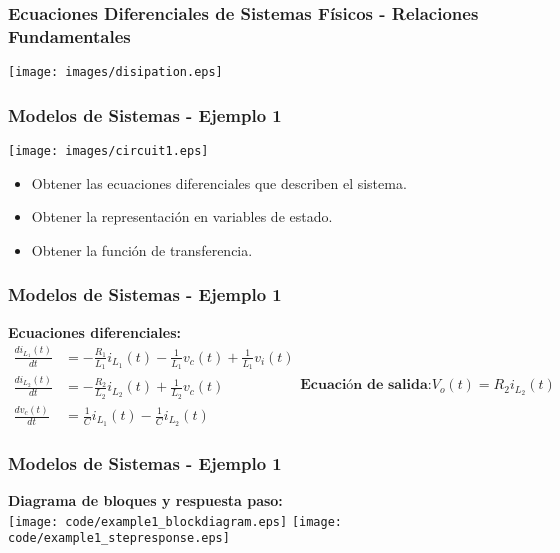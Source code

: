 \documentclass[aspectratio=169,handout]{beamer}
\theoremstyle{definition}
\theoremstyle{plain}
\theoremstyle{remark}
\begin{document}
\begin{frame}[<+->]\frametitle{Ecuaciones Diferenciales de Sistemas Físicos - Relaciones Fundamentales}
\centering
\texttt{[image: images/disipation.eps]}
\end{frame}

\begin{frame}[<+->]\frametitle{Modelos de Sistemas - Ejemplo 1}
\centering
\texttt{[image: images/circuit1.eps]}
\begin{itemize}
  \item Obtener las ecuaciones diferenciales que describen el sistema.
  \item Obtener la representación en variables de estado.
  \item Obtener la función de transferencia.
\end{itemize}
\end{frame}

\begin{frame}[<+->]\frametitle{Modelos de Sistemas - Ejemplo 1}
\textbf{Ecuaciones diferenciales:}
\begin{subequations}\label{eq:diff_eqs}
\begin{align}
  \frac{di_{L_1}(t)}{dt} &= -\frac{R_1}{L_1}i_{L_1}(t) - \frac{1}{L_1} v_c(t) + \frac{1}{L_1} v_i(t) \\
  \frac{di_{L_2}(t)}{dt} &= -\frac{R_2}{L_2}i_{L_2}(t) + \frac{1}{L_2} v_c(t) \\
  \frac{dv_c(t)}{dt} &= \frac{1}{C}i_{L_1}(t) - \frac{1}{C}i_{L_2}(t)
\end{align}
\textbf{Ecuación de salida:}
\begin{equation}
  V_o(t) = R_2 i_{L_2}(t)
\end{equation}
\end{subequations}
\end{frame}

\begin{frame}[<+->]\frametitle{Modelos de Sistemas - Ejemplo 1}
\textbf{Diagrama de bloques y respuesta paso:}\\
\vspace*{3mm}
\centering
\texttt{[image: code/example1\_blockdiagram.eps]}
\pause
\hspace*{5mm}
\texttt{[image: code/example1\_stepresponse.eps]}
\end{frame}
\end{document}
